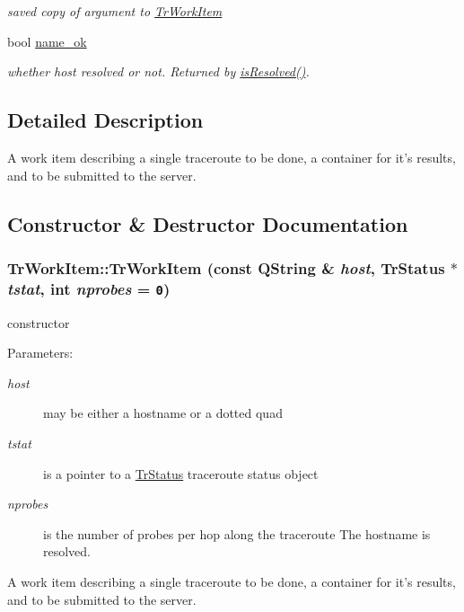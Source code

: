 \begin{CompactItemize}
\begin{CompactList}\small\item\em saved copy of argument to \hyperlink{classTrWorkItem}{TrWorkItem} \item\end{CompactList}\item 
\hypertarget{classTrWorkItem_06e4ade2f71c43a083bbdbbb24f53590}{
bool \hyperlink{classTrWorkItem_06e4ade2f71c43a083bbdbbb24f53590}{name\_\-ok}}
\label{classTrWorkItem_06e4ade2f71c43a083bbdbbb24f53590}

\begin{CompactList}\small\item\em whether host resolved or not. Returned by \hyperlink{classTrWorkItem_e95da0459466fe9c4cd30384e75dfc1c}{isResolved()}. \item\end{CompactList}\end{CompactItemize}


\subsection{Detailed Description}
A work item describing a single traceroute to be done, a container for it's results, and to be submitted to the server. 

\subsection{Constructor \& Destructor Documentation}
\hypertarget{classTrWorkItem_4316e5497fae321cd211ac3cafd60b4d}{
\subsubsection[TrWorkItem]{\setlength{\rightskip}{0pt plus 5cm}TrWorkItem::TrWorkItem (const QString \& {\em host}, \/  {\bf TrStatus} $\ast$ {\em tstat}, \/  int {\em nprobes} = {\tt 0})}}
\label{classTrWorkItem_4316e5497fae321cd211ac3cafd60b4d}


constructor \begin{Desc}
\item[Parameters:]
\begin{description}
\item[{\em host}]may be either a hostname or a dotted quad \item[{\em tstat}]is a pointer to a \hyperlink{classTrStatus}{TrStatus} traceroute status object \item[{\em nprobes}]is the number of probes per hop along the traceroute The hostname is resolved.\end{description}
\end{Desc}
A work item describing a single traceroute to be done, a container for it's results, and to be submitted to the server. 

